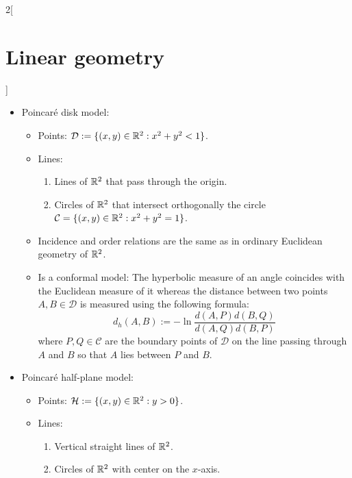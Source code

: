 \documentclass[../../../main.tex]{subfiles}
\begin{document}
\begin{multicols}{2}[\section{Linear geometry}]
\begin{definition}
\begin{itemize}
\begin{center}
            \end{center}
      \item Poincaré disk model:
            \begin{itemize}
              \item Points: $\mathcal{D}:=\{(x,y)\in\mathbb{R}^2:x^2+y^2<1\}$.
              \item Lines:
                    \begin{enumerate}
                      \item Lines of $\mathbb{R}^2$ that pass through the origin.
                      \item Circles of $\mathbb{R}^2$ that intersect orthogonally the circle $\mathcal{C}=\{(x,y)\in\mathbb{R}^2:x^2+y^2=1\}$.
                    \end{enumerate}
              \item Incidence and order relations are the same as in ordinary Euclidean geometry of $\mathbb{R}^2$.
              \item Is a conformal model: The hyperbolic measure of an angle coincides with the Euclidean measure of it whereas the distance between two points $A,B\in\mathcal{D}$ is measured using the following formula: $$d_h(A,B):=-\ln\frac{d(A,P)d(B,Q)}{d(A,Q)d(B,P)}$$ where $P,Q\in\mathcal{C}$ are the boundary points of $\mathcal{D}$ on the line passing through $A$ and $B$ so that $A$ lies between $P$ and $B$.
            \end{itemize}
            \begin{center}
              \begin{minipage}{\linewidth}
                \centering
                
              \end{minipage}
            \end{center}
      \item Poincaré half-plane model:
            \begin{itemize}
              \item Points: $\mathcal{H}:=\{(x,y)\in\mathbb{R}^2:y>0\}$.
              \item Lines:
                    \begin{enumerate}
                      \item Vertical straight lines of $\mathbb{R}^2$.
                      \item Circles of $\mathbb{R}^2$ with center on the $x$-axis.
                    \end{enumerate}

\end{itemize}
\end{itemize}
\end{definition}
\end{multicols}
\end{document}
